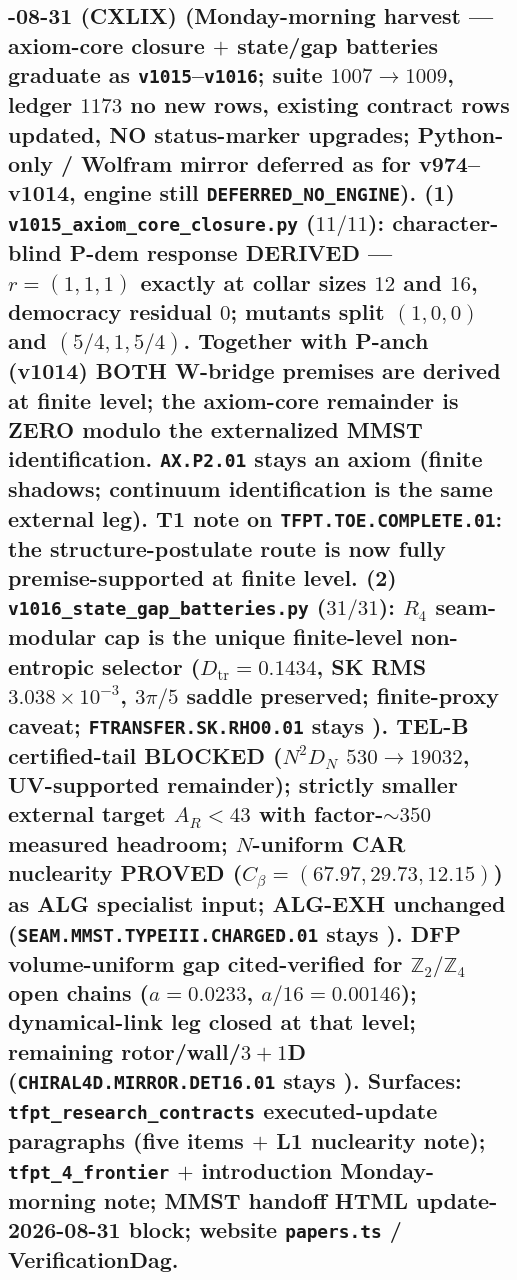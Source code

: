 \subsection*{-08-31 (CXLIX) (Monday-morning harvest --- axiom-core closure $+$ state/gap batteries graduate as \texttt{v1015}--\texttt{v1016}; suite $1007 \to 1009$, ledger $1173$ no new rows, existing contract rows updated, NO status-marker upgrades; Python-only / Wolfram mirror deferred as for v974--v1014, engine still \texttt{DEFERRED\_NO\_ENGINE}).  \textbf{(1)} \texttt{v1015\_\allowbreak axiom\_\allowbreak core\_\allowbreak closure.py} ($11/11$): character-blind P-dem response DERIVED --- $r=(1,1,1)$ exactly at collar sizes $12$ and $16$, democracy residual $0$; mutants split $(1,0,0)$ and $(5/4,1,5/4)$.  Together with P-anch (v1014) BOTH W-bridge premises are derived at finite level; the axiom-core remainder is ZERO modulo the externalized MMST identification.  \texttt{AX.P2.01} stays an axiom (finite shadows; continuum identification is the same external leg).  T1 note on \texttt{TFPT.TOE.COMPLETE.01}: the structure-postulate route is now fully premise-supported at finite level.  \textbf{(2)} \texttt{v1016\_\allowbreak state\_\allowbreak gap\_\allowbreak batteries.py} ($31/31$): $R_4$ seam-modular cap is the unique finite-level non-entropic selector ($D_{\mathrm{tr}}=0.1434$, SK RMS $3.038{\times}10^{-3}$, $3\pi/5$ saddle preserved; finite-proxy caveat; \texttt{FTRANSFER.SK.RHO0.01} stays \mO).  TEL-B certified-tail BLOCKED ($N^2 D_N$ $530\to19032$, UV-supported remainder); strictly smaller external target $A_R<43$ with factor-$\sim350$ measured headroom; $N$-uniform CAR nuclearity PROVED ($C_\beta=(67.97,29.73,12.15)$) as ALG specialist input; ALG-EXH unchanged (\texttt{SEAM.MMST.TYPEIII.CHARGED.01} stays \mO).  DFP volume-uniform gap cited-verified for $\mathbb Z_2/\mathbb Z_4$ open chains ($a=0.0233$, $a/16=0.00146$); dynamical-link leg closed at that level; remaining rotor/wall/$3{+}1$D (\texttt{CHIRAL4D.MIRROR.DET16.01} stays \mC).  Surfaces: \texttt{tfpt\_research\_contracts} executed-update paragraphs (five items $+$ L1 nuclearity note); \texttt{tfpt\_4\_frontier} $+$ introduction Monday-morning note; MMST handoff HTML update-2026-08-31 block; website \texttt{papers.ts} / VerificationDag.}

